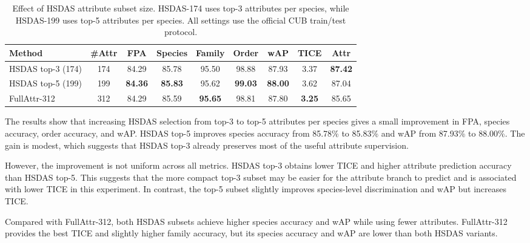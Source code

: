 \begin{table}[t]
    \centering
    \caption{Effect of HSDAS attribute subset size. HSDAS-174 uses top-3 attributes per species, while HSDAS-199 uses top-5 attributes per species. All settings use the official CUB train/test protocol.}
    \label{tab:attr_subset_size}
    \scriptsize
    \setlength{\tabcolsep}{3pt}
    \renewcommand{\arraystretch}{1.12}
    \begin{adjustbox}{max width=\textwidth}
    \begin{tabular}{@{}lcccccccc@{}}
        \hline
        \textbf{Method} & \textbf{\#Attr} & \textbf{FPA} & \textbf{Species} & \textbf{Family} & \textbf{Order} & \textbf{wAP} & \textbf{TICE} & \textbf{Attr} \\
        \hline
        HSDAS top-3 (174) 
        & 174 & 84.29 & 85.78 & 95.50 & 98.88 & 87.93 & 3.37 & \textbf{87.42} \\
        HSDAS top-5 (199) 
        & 199 & \textbf{84.36} & \textbf{85.83} & 95.62 & \textbf{99.03} & \textbf{88.00} & 3.62 & 87.04 \\
        FullAttr-312 
        & 312 & 84.29 & 85.59 & \textbf{95.65} & 98.81 & 87.80 & \textbf{3.25} & 85.65 \\
        \hline
    \end{tabular}
    \end{adjustbox}
\end{table}

The results show that increasing HSDAS selection from top-3 to top-5 attributes per species gives a small improvement in FPA, species accuracy, order accuracy, and wAP. HSDAS top-5 improves species accuracy from 85.78\% to 85.83\% and wAP from 87.93\% to 88.00\%. The gain is modest, which suggests that HSDAS top-3 already preserves most of the useful attribute supervision.

However, the improvement is not uniform across all metrics. HSDAS top-3 obtains lower TICE and higher attribute prediction accuracy than HSDAS top-5. This suggests that the more compact top-3 subset may be easier for the attribute branch to predict and is associated with lower TICE in this experiment. In contrast, the top-5 subset slightly improves species-level discrimination and wAP but increases TICE.

Compared with FullAttr-312, both HSDAS subsets achieve higher species accuracy and wAP while using fewer attributes. FullAttr-312 provides the best TICE and slightly higher family accuracy, but its species accuracy and wAP are lower than both HSDAS variants.

